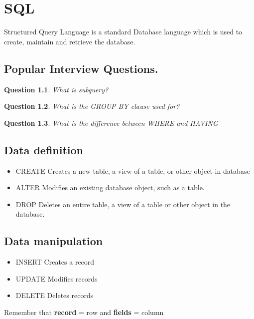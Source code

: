 \documentclass{book}
\newtheorem{question}{Question}[section]
\begin{document}
\chapter{SQL}
Structured Query Language is a standard Database language which is used to create, maintain and retrieve the database.
\section{Popular Interview Questions.}
\begin{question}
What is subquery?
\end{question}

\begin{question}
What is the GROUP BY clause used for?
\end{question}

\begin{question}
What is the difference between WHERE and HAVING
\end{question}


\section{Data definition}
\begin{itemize}
\item CREATE Creates a new table, a view of a table, or other object in database
\item ALTER Modifies an existing database object, such as a table.
\item DROP Deletes an entire table, a view of a table or other object in the database.

\end{itemize}
\section{Data manipulation}
\begin{itemize}
\item INSERT Creates a record
\item UPDATE Modifies records
\item DELETE Deletes records
\end{itemize}
Remember that \textbf{record} = row and \textbf{fields} = column
\end{document}
